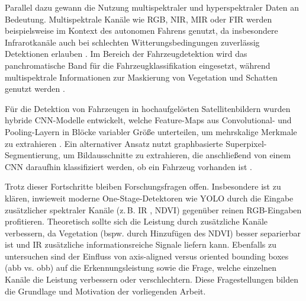 Parallel dazu gewann die Nutzung multispektraler und hyperspektraler Daten an Bedeutung. Multispektrale Kanäle wie \acrshort{RGB}, \acrshort{NIR}, \Acrfull{MIR} oder \Acrfull{FIR} werden beispielsweise im Kontext des autonomen Fahrens genutzt, da insbesondere Infrarotkanäle auch bei schlechten Witterungsbedingungen zuverlässig Detektionen erlauben \cite{Takumi2017}. Im Bereich der Fahrzeugdetektion wird das panchromatische Band für die Fahrzeugklassifikation eingesetzt, während multispektrale Informationen zur Maskierung von Vegetation und Schatten genutzt werden \cite{Eikvil2009}.

Für die Detektion von Fahrzeugen in hochaufgelösten Satellitenbildern wurden hybride \acrshort{CNN}-Modelle entwickelt, welche Feature-Maps aus Convolutional- und Pooling-Layern in Blöcke variabler Größe unterteilen, um mehrskalige Merkmale zu extrahieren \cite{XueyunChen2014}. Ein alternativer Ansatz nutzt graphbasierte Superpixel-Segmentierung, um Bildausschnitte zu extrahieren, die anschließend von einem \acrshort{CNN} daraufhin klassifiziert werden, ob ein Fahrzeug vorhanden ist \cite{Jiang2015}.

Trotz dieser Fortschritte bleiben Forschungsfragen offen. Insbesondere ist zu klären, inwieweit moderne One-Stage-Detektoren wie \acrshort{YOLO} durch die Eingabe zusätzlicher spektraler Kanäle (z.\,B. \Acrfull{IR} , \acrshort{NDVI}) gegenüber reinen \acrshort{RGB}-Eingaben profitieren. Theoretisch sollte sich die Leistung durch zusätzliche Kanäle verbessern, da Vegetation (bspw. durch Hinzufügen des \acrshort{NDVI}) besser separierbar ist und \acrshort{IR} zusätzliche informationsreiche Signale liefern kann. Ebenfalls zu untersuchen sind der Einfluss von axis-aligned versus oriented bounding boxes (\acrshort{abb} vs. \acrshort{obb}) auf die Erkennungsleistung sowie die Frage, welche einzelnen Kanäle die Leistung verbessern oder verschlechtern. Diese Fragestellungen bilden die Grundlage und Motivation der vorliegenden Arbeit. 



